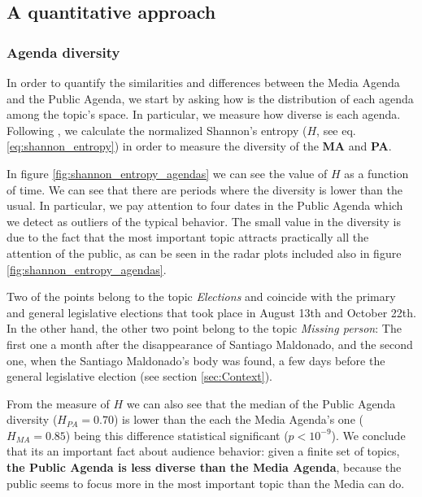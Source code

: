 \documentclass{bmcart}
\begin{document}
\subsection*{A quantitative approach}

\subsubsection*{Agenda diversity}


\par In order to quantify the similarities and differences between the Media Agenda and the Public Agenda, we start by asking how is the distribution of each agenda among the topic's space. In particular, we measure how diverse is each agenda. Following \cite{boydstun2014importance}, we calculate the normalized Shannon's entropy ($H$, see eq.\ref{eq:shannon_entropy}) in order to measure the diversity of the \textbf{MA} and \textbf{PA}.
\par In figure \ref{fig:shannon_entropy_agendas} we can see the value of $H$ as a function of time. We can see that there are periods where the diversity is lower than the usual. In particular, we pay attention to four dates in the Public Agenda which we detect as outliers of the typical behavior. The small value in the diversity is due to the fact that the most important topic attracts practically all the attention of the public, as can be seen in the radar plots included also in figure \ref{fig:shannon_entropy_agendas}.

Two of the points belong to the topic \emph{Elections} and coincide with the primary and general legislative elections that took place in August 13th and October 22th. In the other hand, the other two point belong to the topic \emph{Missing person}: The first one a month after the disappearance of Santiago Maldonado, and the second one, when the Santiago Maldonado's body was found, a few days before the general legislative election (see section \ref{sec:Context}).

\par From the measure of $H$ we can also see that the median of the Public Agenda diversity ($H_{PA} = 0.70$) is lower than the each the Media Agenda's one ($H_{MA} = 0.85$) being this difference statistical significant ($p < 10^{-9}$).
We conclude that its an important fact about audience behavior: given a finite set of topics, \textbf{the Public Agenda is less diverse than the Media Agenda}, because the public seems to focus more in the most important topic than the Media can do.
\end{document}

